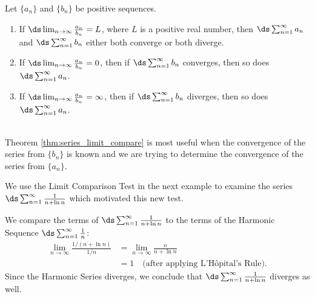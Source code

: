 {Let $\{a_n\}$ and $\{b_n\}$ be positive sequences.
	\begin{enumerate}
		\item If $\ds\lim_{n\to\infty} \frac{a_n}{b_n} = L$, where $L$ is a positive real number, then $\ds \sum_{n=1}^\infty a_n$ and $\ds \sum_{n=1}^\infty b_n$ either both converge or both diverge.
		\item	If $\ds\lim_{n\to\infty} \frac{a_n}{b_n} = 0$, then if $\ds \sum_{n=1}^\infty b_n$ converges, then so does $\ds \sum_{n=1}^\infty a_n$.
		\item	If $\ds\lim_{n\to\infty} \frac{a_n}{b_n} = \infty$, then if $\ds \sum_{n=1}^\infty b_n$ diverges, then so does $\ds \sum_{n=1}^\infty a_n$.
	\end{enumerate}
}\\


Theorem \ref{thm:series_limit_compare} is most useful when the convergence of the series from $\{b_n\}$ is known and we are trying to determine the convergence of the series from $\{a_n\}$. 

We use the Limit Comparison Test in the next example to examine the series $\ds\sum_{n=1}^\infty \frac1{n+\ln n}$ which motivated this new test.\\
\pagebreak

{We compare the terms of $\ds\sum_{n=1}^\infty \frac1{n+\ln n}$ to the terms of the Harmonic Sequence $\ds\sum_{n=1}^\infty \frac1{n}$:
\begin{align*}
\lim_{n\to\infty}\frac{1/(n+\ln n)}{1/n} &= \lim_{n\to\infty} \frac{n}{n+\ln n} \\
			&= 1\quad \text{(after applying L'H\^opital's Rule)}.
\end{align*}
Since the Harmonic Series diverges, we conclude that $\ds\sum_{n=1}^\infty \frac1{n+\ln n}$ diverges as well.
}\\

